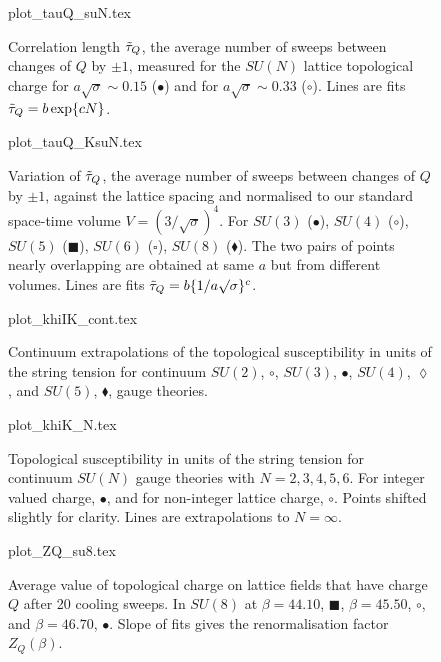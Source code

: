 \documentclass[12pt]{article}
\begin{document}
\begin{figure}[htb]
\begin	{center}
\leavevmode
	{plot_tauQ_suN.tex}
\end	{center}
\caption{Correlation length $\Tilde{\tau}_Q$, the average number of sweeps between changes of $Q$ by $\pm 1$,
  measured for the $SU(N)$ lattice topological charge
  for $a\surd\sigma \sim 0.15$ ($\bullet$) and for $a\surd\sigma \sim 0.33$ ($\circ$).
  Lines are fits $\Tilde{\tau}_Q = b\exp\{cN\}$.}
\label{fig_tauQ_suN}
\end{figure}


\begin{figure}[htb]
\begin	{center}
\leavevmode
	{plot_tauQ_KsuN.tex}
\end	{center}
\caption{Variation of $\Tilde{\tau}_Q$, the average number of sweeps between changes of $Q$ by $\pm 1$,
  against the lattice spacing and normalised to our standard space-time volume $V=(3/\surd\sigma)^4$.
  For $SU(3)$ ($\bullet$), $SU(4)$ ($\circ$), $SU(5)$ ($\blacksquare$),
  $SU(6)$ ($\square$), $SU(8)$ ($\blacklozenge$). The two pairs of points nearly overlapping
  are obtained at same $a$ but from different volumes. Lines are fits
  $\Tilde{\tau}_Q = b\{1/a\surd\sigma\}^c$.}
\label{fig_tauQ_KsuN}
\end{figure}




\begin{figure}[htb]
\begin	{center}
\leavevmode
	{plot_khiIK_cont.tex}
\end	{center}
\caption{Continuum extrapolations of the topological susceptibility in units of the string tension for
  continuum $SU(2)$, $\circ$, $SU(3)$, $\bullet$, $SU(4)$, $\lozenge$, and $SU(5)$, $\blacklozenge$,
  gauge theories.}
\label{fig_khiIK_cont}
\end{figure}




\begin{figure}[htb]
\begin	{center}
\leavevmode
	{plot_khiK_N.tex}
\end	{center}
\caption{Topological susceptibility in units of the string tension for
  continuum $SU(N)$ gauge theories with $N=2,3,4,5,6$. For integer valued
  charge, $\bullet$, and for non-integer lattice charge, $\circ$. Points
  shifted slightly for clarity. Lines are extrapolations to $N=\infty$. }
\label{fig_khiK_N}
\end{figure}




\begin{figure}[htb]
\begin	{center}
\leavevmode
	{plot_ZQ_su8.tex}
\end	{center}
\caption{Average value of topological charge on lattice fields that
  have charge $Q$ after 20 cooling sweeps. In $SU(8)$ at $\beta =44.10$, $\blacksquare$,
  $\beta =45.50$, $\circ$, and $\beta =46.70$, $\bullet$. Slope of fits gives the
  renormalisation factor $Z_Q(\beta)$.} 
\label{fig_ZQ_su8}
\end{figure}
\end{document}

